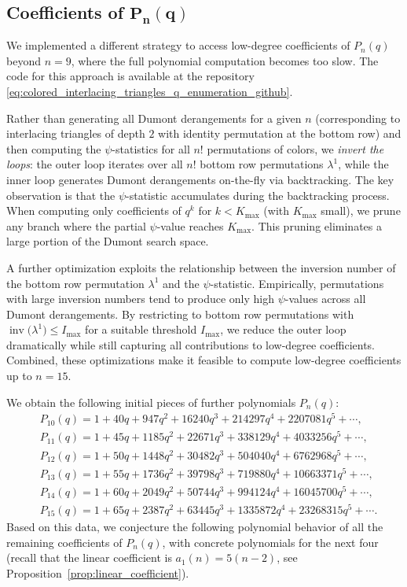 \documentclass[pdftex]{sigma}
\numberwithin{equation}{section}
\theoremstyle{definition}
\begin{document}
\subsection[Coefficients of P\_n(q)]{Coefficients of $\boldsymbol{P_n(q)}$}
\label{subsec:conjectures_on_coefficients}

We implemented a different strategy to access low-degree coefficients of
$P_n(q)$ beyond $n=9$, where the full polynomial computation becomes too slow.
The code for this approach is available at the repository
\eqref{eq:colored_interlacing_triangles_q_enumeration_github}.

Rather than generating all Dumont derangements for a given $n$ (corresponding to
interlacing triangles of depth $2$ with identity permutation at the bottom row)
and then computing the $\psi$-statistics for all $n!$ permutations of colors, we
\emph{invert the loops}: the outer loop iterates over all $n!$ bottom row
permutations $\lambda^1$, while the inner loop generates Dumont derangements
on-the-fly via backtracking.
The key observation is that the $\psi$-statistic accumulates during the
backtracking process.
When computing only coefficients of $q^k$ for $k<K_{\max}$ (with $K_{\max}$
small), we prune any branch where the partial $\psi$-value reaches $K_{\max}$.
This pruning eliminates a large portion of the Dumont search space.

A further optimization exploits the relationship between the inversion number of
the bottom row permutation $\lambda^1$ and the $\psi$-statistic.
Empirically, permutations with large inversion numbers tend to produce only high
$\psi$-values across all Dumont derangements.
By restricting to bottom row permutations with
$\operatorname{inv}\bigl(\lambda^1\bigr) \leq I_{\max}$ for a suitable threshold
$I_{\max}$, we reduce the outer loop dramatically while still capturing all
contributions to low-degree coefficients.
Combined, these optimizations make it feasible to compute low-degree
coefficients up to $n = 15$.

We obtain the following initial pieces of further polynomials $P_n(q)$:
\begin{align*}
	&P_{10}(q)= 1 + 40q + 947q^2 + 16240q^3 + 214297q^4 + 2207081q^5 +\cdots,	\\
	&P_{11}(q)= 1+45q + 1185q^2 + 22671q^3 + 338129q^4 +4033256 q^5+\cdots,	\\
	&P_{12}(q)= 1 + 50q + 1448q^2 + 30482q^3 + 504040q^4 +6762968 q^5 +\cdots,	\\
	&P_{13}(q)= 1 + 55q + 1736q^2 + 39798q^3 + 719880q^4 +10663371q^5 +\cdots,	\\
	&P_{14}(q)= 1 + 60q + 2049q^2 + 50744q^3 + 994124q^4 +16045700 q^5 +\cdots,	\\
	&P_{15}(q)= 1 + 65q + 2387q^2 + 63445q^3 + 1335872q^4 + 23268315 q^5+
	\cdots.
\end{align*}
Based on this data, we conjecture the following polynomial behavior of all the
remaining coefficients of $P_n(q)$, with concrete polynomials for the next four
(recall that the linear coefficient is $a_1(n)=5(n-2)$, see
Proposition~\ref{prop:linear_coefficient}).
\end{document}
